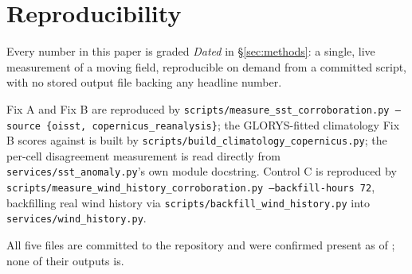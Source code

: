 \documentclass[runningheads]{llncs}
\begin{document}
\begin{abstract}
SST product and its climatology fixed and varying only the wind/currents
input's temporal aggregation instead: both tiers move only slightly, in the
same direction, and by less than the matched arm's own run-to-run variation
--- evidence against instantaneous sampling being the cause. Every number
reported here is a single, dated, live measurement of a moving field, not a
standing artifact, and the general rule this evidence points toward --- safe
substitution up to a threshold set by the inter-product spread --- remains to
be established beyond the two source pairs measured here.
\end{abstract}



\section*{Reproducibility}
Every number in this paper is graded \emph{Dated} in \S\ref{sec:methods}: a
single, live measurement of a moving field, reproducible on demand from a
committed script, with no stored output file backing any headline number.
{\raggedright\sloppy
Fix A and Fix B are reproduced by
\texttt{scripts/measure\_sst\_corroboration.py --source \{oisst,
copernicus\_reanalysis\}}; the GLORYS-fitted climatology Fix B scores against
is built by \texttt{scripts/build\_climatology\_copernicus.py}; the per-cell
disagreement measurement is read directly from
\texttt{services/sst\_anomaly.py}'s own module docstring. Control C is
reproduced by \texttt{scripts/measure\_wind\_history\_corroboration.py
--backfill-hours 72}, backfilling real wind history via
\texttt{scripts/backfill\_wind\_history.py} into
\texttt{services/wind\_history.py}.\par}
All five files are committed to the repository and were confirmed present as
of \AsOf{}; none of their outputs is.



\end{document}
